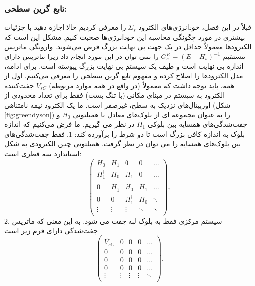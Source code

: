 \subsubsection{تابع گرین سطحی:}
قبلاً در این فصل، خودانرژی‌های الکترود $\Sigma_{s}$ را معرفی کردیم حالا اجازه دهید با جزئیات بیشتری در مورد چگونگی محاسبه این خودانرژی‌ها صحبت کنیم. مشکل این است که الکترودها معمولاً حداقل در یک جهت بی نهایت بزرگ فرض می‌شوند. وارونگی ماتریس مستقیم $G^R_s = (E-H_s)^{-1}$ را نمی توان در این مورد انجام داد زیرا ماتریس دارای اندازه بی نهایت است و طیف یک سیستم بی نهایت بزرگ پیوسته است.
برای ادامه، مدل الکترودها را اصلاح کرده و مفهوم تابع گرین سطحی را معرفی می‌کنیم. اول از همه، باید توجه داشت که معمولاً (در واقع در همه موارد مربوطه) $V_{sC}$ جفت‌کننده الکترود به سیستم در مبنای مکانی (با تنگ بست) فقط برای تعداد محدودی از اوربیتال‌های نزدیک به سطح، غیرصفر است. ما یک الکترود نیمه نامتناهی (شکل \ref{fig:greendyson}) را به عنوان مجموعه ای از بلوک‌های معادل با همیلتونی $H_0$ و  ‌جفت‌شدگی‌های همسایه بین بلوکی $H_1$ در نظر می گیریم. ما فرض می‌کنیم که اندازه بلوک به اندازه کافی بزرگ است تا دو شرط را برآورده کند:
1.	 فقط  ‌جفت‌شدگی‌های بین بلوک‌های همسایه را می توان در نظر گرفت. همیلتونی چنین الکترودی به شکل استاندارد سه قطری است:
\begin{equation}
    \left( \begin{matrix}
           {{H}_{0}} & {{H}_{1}} & 0 & 0 & \ldots   \\
           H_{1}^{\dagger } & {{H}_{0}} & {{H}_{1}} & 0 & \ldots   \\
           0 & H_{1}^{\dagger } & {{H}_{0}} & {{H}_{1}} & \ldots   \\
           0 & 0 & H_{1}^{\dagger } & {{H}_{0}} & \ddots   \\
           \vdots  & \vdots  & \vdots  & \ddots  & \ddots   \\
        \end{matrix} \right),
        \label{eq:genhamiltoninamatrixlead}
\end{equation}
2.	سیستم مرکزی فقط به بلوک لبه جفت می شود. به این معنی که ماتریس جفت‌شدگی دارای فرم زیر است
\begin{equation}
    \left( 
        \begin{matrix}
           \widetilde{{{V}_{sC}}} & 0 & 0 & 0 & \ldots   \\
           0 & 0 & 0 & 0 & \ldots   \\
           0 & 0 & 0 & 0 & \ldots   \\
           0 & 0 & 0 & 0 & \ldots   \\
           \vdots  & \vdots  & \vdots  & \vdots  & \ddots   \\
        \end{matrix} 
    \right).
\end{equation}
